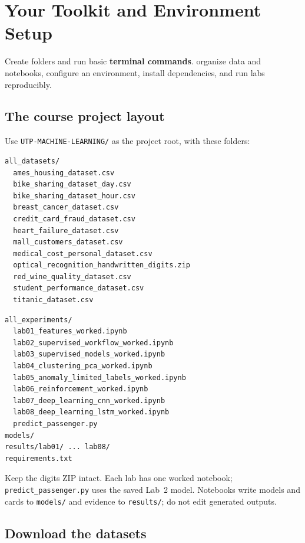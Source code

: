 \chapter{Your Toolkit and Environment Setup}
\label{ch:toolkit}

\chapterguide%
  {Create folders and run basic \textbf{terminal commands}.}
  {organize data and notebooks, configure an environment, install dependencies, and run labs reproducibly.}

\section{The course project layout}

Use \texttt{UTP-MACHINE-LEARNING/} as the project root, with these folders:

\noindent
\begin{minipage}[t]{0.49\linewidth}
\begin{lstlisting}[style=utpterminal]
all_datasets/
  ames_housing_dataset.csv
  bike_sharing_dataset_day.csv
  bike_sharing_dataset_hour.csv
  breast_cancer_dataset.csv
  credit_card_fraud_dataset.csv
  heart_failure_dataset.csv
  mall_customers_dataset.csv
  medical_cost_personal_dataset.csv
  optical_recognition_handwritten_digits.zip
  red_wine_quality_dataset.csv
  student_performance_dataset.csv
  titanic_dataset.csv
\end{lstlisting}
\end{minipage}\hfill
\begin{minipage}[t]{0.49\linewidth}
\begin{lstlisting}[style=utpterminal]
all_experiments/
  lab01_features_worked.ipynb
  lab02_supervised_workflow_worked.ipynb
  lab03_supervised_models_worked.ipynb
  lab04_clustering_pca_worked.ipynb
  lab05_anomaly_limited_labels_worked.ipynb
  lab06_reinforcement_worked.ipynb
  lab07_deep_learning_cnn_worked.ipynb
  lab08_deep_learning_lstm_worked.ipynb
  predict_passenger.py
models/
results/lab01/ ... lab08/
requirements.txt
\end{lstlisting}
\end{minipage}

{\footnotesize Keep the digits ZIP intact. Each lab has one worked notebook; \texttt{predict\_passenger.py} uses the saved Lab~2 model. Notebooks write models and cards to \texttt{models/} and evidence to \texttt{results/}; do not edit generated outputs.\par}

\section{Download the datasets}

